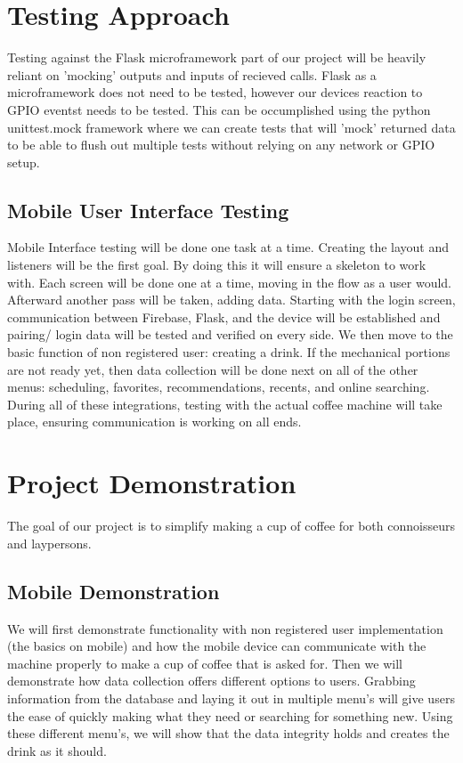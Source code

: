 \documentclass[conference]{IEEEtran}
\begin{document}
\section{Testing Approach}
Testing against the Flask microframework part of our project will be heavily reliant on 'mocking'
outputs and inputs of recieved calls. Flask as a microframework does not need to be tested, however
our devices reaction to GPIO eventst needs to be tested. This can be occumplished using the python
unittest.mock framework  \cite{mock} where we can create tests that will 'mock' returned data to
be able to flush out multiple tests without relying on any network or GPIO setup. 
\subsection{Mobile User Interface Testing}
Mobile Interface testing will be done one task at a time. Creating the layout and listeners will be the first
 goal. By doing this it will ensure a skeleton to work with. Each screen will be done one at a time,
moving in the flow as a user would. Afterward another pass will be taken, adding data. Starting with the
 login screen, communication between Firebase, Flask, and the device will be established and pairing/
 login data will be tested and verified on every side. We then move to the basic function of non
  registered user: creating a drink. If the mechanical portions are not ready yet, then data collection will
   be done next on all of the other menus: scheduling, favorites, recommendations, recents, and online
    searching. During all of these integrations, testing with the actual coffee machine will take place, 
    ensuring communication is working on all ends. 


\section{Project Demonstration}
The goal of our project is to simplify making a cup of coffee for both connoisseurs and laypersons. 
\subsection{Mobile Demonstration}
We will first demonstrate functionality with non registered user implementation (the basics on mobile)
 and how the mobile device can communicate with the machine properly to make a cup of coffee that is
  asked for. Then we will demonstrate how data collection offers different options to users. Grabbing 
  information from the database and laying it out in multiple menu's will give users the ease of quickly 
  making what they need or searching for something new. Using these different menu's, we will show 
  that the data integrity holds and creates the drink as it should. 
\end{document}
